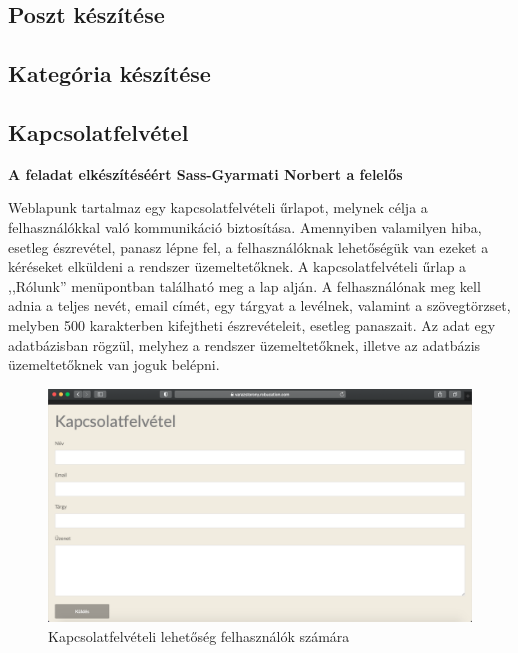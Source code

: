 \documentclass[
]{thesis-ekf}
\theoremstyle{definition}
\theoremstyle{remark}
\begin{document}
		\subsection{Poszt készítése}
		\subsection{Kategória készítése}
		\subsection{Kapcsolatfelvétel}
			\par \textbf{A feladat elkészítéséért Sass-Gyarmati Norbert a felelős}
			\par Weblapunk tartalmaz egy kapcsolatfelvételi űrlapot, melynek célja a felhasználókkal való kommunikáció biztosítása. Amennyiben valamilyen hiba, esetleg észrevétel, panasz lépne fel, a felhasználóknak lehetőségük van ezeket a kéréseket elküldeni a rendszer üzemeltetőknek. A kapcsolatfelvételi űrlap a ,,Rólunk'' menüpontban található meg a lap alján. A felhasználónak meg kell adnia a teljes nevét, email címét, egy tárgyat a levélnek, valamint a szövegtörzset, melyben 500 karakterben kifejtheti észrevételeit, esetleg panaszait. Az adat egy adatbázisban rögzül, melyhez a rendszer üzemeltetőknek, illetve az adatbázis üzemeltetőknek van joguk belépni.
			\begin{figure}[ht]
				\centering
				\includegraphics[scale=0.30]{./images/contactme}
				\caption{Kapcsolatfelvételi lehetőség felhasználók számára}
				\label{fig:contactme}
			\end{figure}
\end{document}
